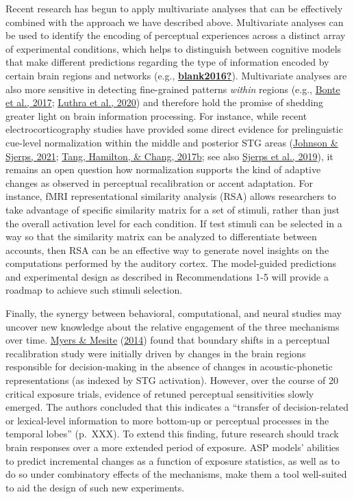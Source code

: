 \documentclass[
  11pt,
  english,
  man,floatsintext]{apa6}
\begin{document}
Recent research has begun to apply multivariate analyses that can be effectively combined with the approach we have described above. Multivariate analyses can be used to identify the encoding of perceptual experiences across a distinct array of experimental conditions, which helps to distinguish between cognitive models that make different predictions regarding the type of information encoded by certain brain regions and networks (e.g., \protect\hyperlink{ref-blank2016}{\textbf{blank2016?}}). Multivariate analyses are also more sensitive in detecting fine-grained patterns \emph{within} regions (e.g., \protect\hyperlink{ref-bonte2017}{Bonte et al., 2017}; \protect\hyperlink{ref-luthra2020a}{Luthra et al., 2020}) and therefore hold the promise of shedding greater light on brain information processing. For instance, while recent electrocorticography studies have provided some direct evidence for prelinguistic cue-level normalization within the middle and posterior STG areas (\protect\hyperlink{ref-johnson-sjerps2021}{Johnson \& Sjerps, 2021}; \protect\hyperlink{ref-tang2017}{Tang, Hamilton, \& Chang, 2017b}; see also \protect\hyperlink{ref-sjerps2019}{Sjerps et al., 2019}), it remains an open question how normalization supports the kind of adaptive changes as observed in perceptual recalibration or accent adaptation. For instance, fMRI representational similarity analysis (RSA) allows researchers to take advantage of specific similarity matrix for a set of stimuli, rather than just the overall activation level for each condition. If test stimuli can be selected in a way so that the similarity matrix can be analyzed to differentiate between accounts, then RSA can be an effective way to generate novel insights on the computations performed by the auditory cortex. The model-guided predictions and experimental design as described in Recommendations 1-5 will provide a roadmap to achieve such stimuli selection.

Finally, the synergy between behavioral, computational, and neural studies may uncover new knowledge about the relative engagement of the three mechanisms over time. \protect\hyperlink{ref-myers-mesite2014}{Myers \& Mesite} (\protect\hyperlink{ref-myers-mesite2014}{2014}) found that boundary shifts in a perceptual recalibration study were initially driven by changes in the brain regions responsible for decision-making in the absence of changes in acoustic-phonetic representations (as indexed by STG activation). However, over the course of 20 critical exposure trials, evidence of retuned perceptual sensitivities slowly emerged. The authors concluded that this indicates a ``transfer of decision-related or lexical-level information to more bottom-up or perceptual processes in the temporal lobes'' (p.~XXX). To extend this finding, future research should track brain responses over a more extended period of exposure. ASP models' abilities to predict incremental changes as a function of exposure statistics, as well as to do so under combinatory effects of the mechanisms, make them a tool well-suited to aid the design of such new experiments.
\end{document}
